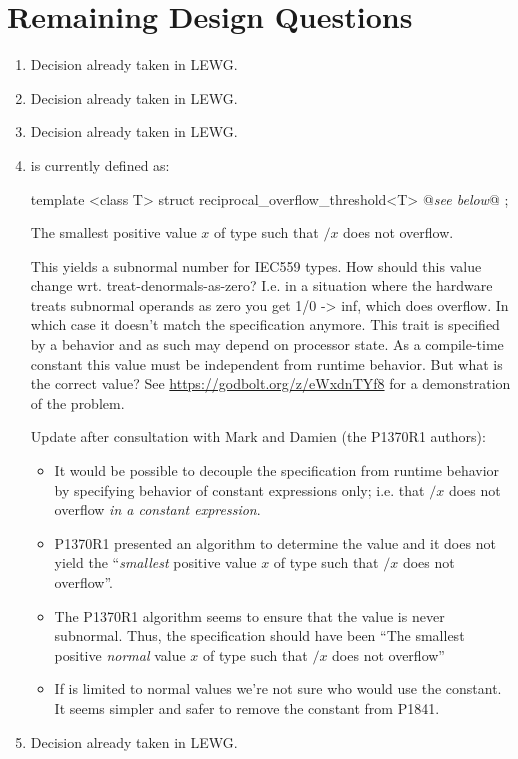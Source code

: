 \section{Remaining Design Questions}
\begin{enumerate}
  \item Decision already taken in LEWG.

  \item Decision already taken in LEWG.

  \item Decision already taken in LEWG.

  \item {} is currently defined as:
  \begin{wgText}
\begin{itemdecl}
  template <class T> struct reciprocal_overflow_threshold<T> { @\emph{see below}@ };
\end{itemdecl}
\begin{itemdescr}
\setcounter{Paras}{8}
  \pnum The smallest positive value $x$ of type  such that $/x$ does not overflow.
\end{itemdescr}
  \end{wgText}
  This yields a subnormal number for IEC559 types.
  How should this value change wrt. treat-denormals-as-zero?
  I.e. in a situation where the hardware treats subnormal operands as zero you get 1/0 -> inf, which does overflow.
  In which case it doesn't match the specification anymore.
  This trait is specified by a behavior and as such may depend on processor state.
  As a compile-time constant this value must be independent from runtime behavior.
  But what is the correct value?
  See \url{https://godbolt.org/z/eWxdnTYf8} for a demonstration of the problem.

  Update after consultation with Mark and Damien (the P1370R1 authors):
  \begin{itemize}
  \item It would be possible to decouple the specification from runtime behavior by specifying behavior of constant expressions only;
    i.e. that $/x$ does not overflow \emph{in a constant expression}.
  \item P1370R1 presented an algorithm to determine the value and it does not yield the “\emph{smallest} positive value $x$ of type  such that $/x$ does not overflow”.
  \item The P1370R1 algorithm seems to ensure that the value is never subnormal.
    Thus, the specification should have been “The smallest positive \emph{normal} value $x$ of type  such that $/x$ does not overflow”
  \item If  is limited to normal values we're not sure who would use the  constant.
    It seems simpler and safer to remove the constant from P1841.
  \end{itemize}

  \item Decision already taken in LEWG.
\end{enumerate}

